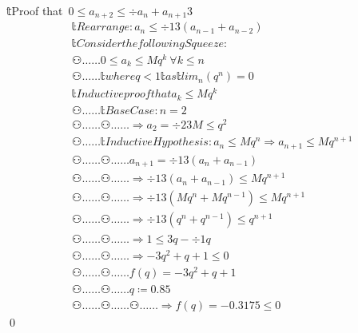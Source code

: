 𝕥{Proof that}\ $0 ≤ a_{n+2} ≤ ÷{a_{n}+a_{n+1}}{3}$
\begin{align*}
    & 𝕥{Rearrange: }a_{n}≤ ÷{1}{3} (a_{n-1}+a_{n-2}) \\ 
    & 𝕥{Consider the following Squeeze: } \\
    & ⚇…… 0≤a_{k}≤  Mq^{k}\ ∀k≤  n \\
    & ⚇…… 𝕥{where } q<1 𝕥{ as } 𝕥{lim}_{n}(q^{n})=0 \\
    & 𝕥{Inductive proof that } a_{k} ≤ Mq^{k} \\
    & ⚇…… 𝕥{Base Case: } n=2 \\
    & ⚇……⚇…… ⇒ a_{2} = ÷{2}{3M} ≤ q^{2} \\
    & ⚇…… 𝕥{Inductive Hypothesis: } a_{n} ≤ Mq^{n} ⇒ a_{n+1} ≤ Mq^{n+1} \\
    & ⚇……⚇…… a_{n+1} = ÷{1}{3}(a_{n}+a_{n-1}) \\
    & ⚇……⚇…… ⇒ ÷{1}{3}(a_{n}+a_{n-1}) ≤ Mq^{n+1} \\
    & ⚇……⚇…… ⇒ ÷{1}{3}(Mq^{n}+Mq^{n-1}) ≤ Mq^{n+1} \\
    & ⚇……⚇…… ⇒ ÷{1}{3}(q^{n}+q^{n-1}) ≤ q^{n+1} \\
    & ⚇……⚇…… ⇒ 1 ≤ 3q - ÷{1}{q} \\
    & ⚇……⚇…… ⇒ -3q^{2}+q+1 ≤ 0 \\
    & ⚇……⚇…… f(q)=-3q^{2}+q+1 \\
    & ⚇……⚇…… q≔0.85 \\
    & ⚇……⚇……⚇…… ⇒ f(q) = -0.3175 ≤ 0
\end{align*} \qed